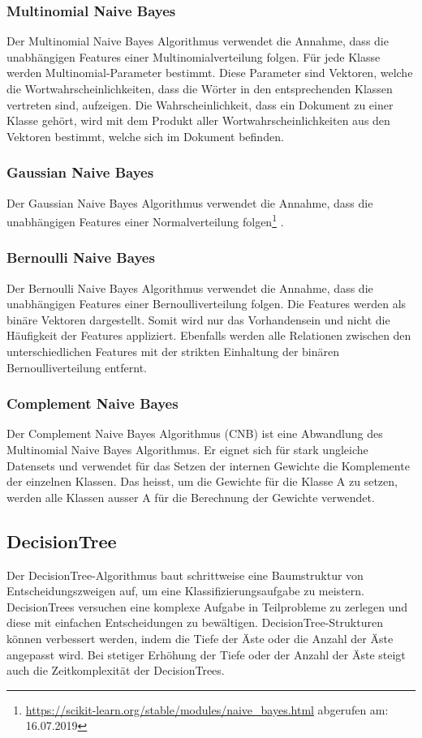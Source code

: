 \subsubsection{Multinomial Naive Bayes}
Der Multinomial Naive Bayes Algorithmus verwendet die Annahme, dass die unabhängigen Features einer Multinomialverteilung folgen.
Für jede Klasse werden Multinomial-Parameter bestimmt.
Diese Parameter sind Vektoren, welche die Wortwahrscheinlichkeiten, dass die Wörter in den entsprechenden Klassen vertreten sind, aufzeigen.
Die Wahrscheinlichkeit, dass ein Dokument zu einer Klasse gehört, wird mit dem Produkt aller Wortwahrscheinlichkeiten aus den Vektoren bestimmt, welche sich im Dokument befinden. \cite{rennie2003tackling}
\subsubsection{Gaussian Naive Bayes}
Der Gaussian Naive Bayes Algorithmus verwendet die Annahme, dass die unabhängigen Features einer Normalverteilung folgen\footnote{\url{https://scikit-learn.org/stable/modules/naive_bayes.html} abgerufen am: 16.07.2019} \cite{scikit-learn}.
\subsubsection{Bernoulli Naive Bayes}
Der Bernoulli Naive Bayes Algorithmus verwendet die Annahme, dass die unabhängigen Features einer Bernoulliverteilung folgen.
Die Features werden als binäre Vektoren dargestellt.
Somit wird nur das Vorhandensein und nicht die Häufigkeit der Features appliziert.
Ebenfalls werden alle Relationen zwischen den unterschiedlichen Features mit der strikten Einhaltung der binären Bernoulliverteilung entfernt. \cite{mccallum1998comparison}
\subsubsection{Complement Naive Bayes}
Der Complement Naive Bayes Algorithmus (CNB) ist eine Abwandlung des Multinomial Naive Bayes Algorithmus.
Er eignet sich für stark ungleiche Datensets und verwendet für das Setzen der internen Gewichte die Komplemente der einzelnen Klassen.
Das heisst, um die Gewichte für die Klasse A zu setzen, werden alle Klassen ausser A für die Berechnung der Gewichte verwendet. \cite{rennie2003tackling}
\subsection{DecisionTree}\label{sec:trees}
Der DecisionTree-Algorithmus baut schrittweise eine Baumstruktur von Entscheidungszweigen auf, um eine Klassifizierungsaufgabe zu meistern.
DecisionTrees versuchen eine komplexe Aufgabe in Teilprobleme zu zerlegen und diese mit einfachen Entscheidungen zu bewältigen.
DecisionTree-Strukturen können verbessert werden, indem die Tiefe der Äste oder die Anzahl der Äste angepasst wird.
Bei stetiger Erhöhung der Tiefe oder der Anzahl der Äste steigt auch die Zeitkomplexität der DecisionTrees. \cite{safavian1991survey}
